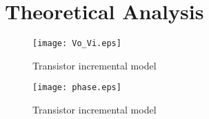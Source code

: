 \newpage
\section{Theoretical Analysis}
\label{sec:analysis}



\begin{figure}[H]
        \centering
        \texttt{[image: Vo\_Vi.eps]}
        \caption{Transistor incremental model}
        \label{transistorinc}
\end{figure}

\begin{figure}[H]
        \centering
        \texttt{[image: phase.eps]}
        \caption{Transistor incremental model}
        \label{transistorinc}
\end{figure}
